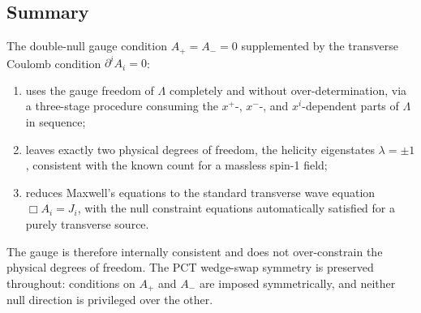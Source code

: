 \subsection{Summary}

The double-null gauge condition $A_+ = A_- = 0$ supplemented by the transverse 
Coulomb condition $\partial^i A_i = 0$:
\begin{enumerate}
    \item uses the gauge freedom of $\Lambda$ completely and without over-determination,
          via a three-stage procedure consuming the $x^+$-, $x^-$-, and $x^i$-dependent
          parts of $\Lambda$ in sequence;
    \item leaves exactly two physical degrees of freedom, the helicity eigenstates
          $\lambda = \pm 1$, consistent with the known count for a massless spin-1 field;
    \item reduces Maxwell's equations to the standard transverse wave equation
          $\Box A_i = J_i$, with the null constraint equations automatically satisfied
          for a purely transverse source.
\end{enumerate}
The gauge is therefore internally consistent and does not over-constrain the physical 
degrees of freedom. The PCT wedge-swap symmetry is preserved throughout: 
conditions on $A_+$ and $A_-$ are imposed symmetrically, and neither null direction 
is privileged over the other.
